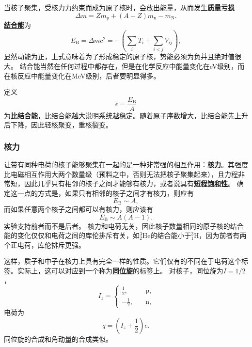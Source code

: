 \documentclass[UTF8, a4paper]{ctexart}
\newcommand*{\nuclear}[3]{^{#2}_{#3}\text{#1}}
\newcommand*{\concept}[1]{\underline{\textbf{#1}}}
\begin{document}
当核子聚集，受核力力约束而成为原子核时，会放出能量，从而发生\concept{质量亏损}
\begin{equation}
    \Delta m = Z m_\text{p} + (A - Z) m_\text{n} - m_\text{N}.
\end{equation}
\concept{结合能}为
\begin{equation}
    E_\text{B} = \Delta m c^2 = - \left( \sum_i T_i + \sum_{i < j} V_{ij} \right), 
\end{equation}
显然动能为正，上式意味着为了形成稳定的原子核，势能必须为负并且绝对值很大。
结合能当然在任何过程中都存在，但是在化学反应中能量变化在eV级别，而在核反应中能量变化在MeV级别，后者要明显得多。

定义
\begin{equation}
    \epsilon = \frac{E_\text{B}}{A} 
\end{equation}
为\concept{比结合能}，比结合能越大说明系统越稳定。随着原子序数增大，比结合能先上升后下降，因此轻核聚变，重核裂变。

\subsubsection{核力}

让带有同种电荷的核子能够聚集在一起的是一种非常强的相互作用：\concept{核力}。其强度比电磁相互作用大两个数量级（预料之中，否则无法把核子聚集起来），且力程非常短，因此几乎只有相邻的核子之间才能够有核力，或者说具有\concept{短程饱和性}。
确定这一点的方式是，如果只有相邻的核子之间才有核力，则应有
\[
    E_\text{B} \sim A,
\]
而如果任意两个核子之间都可以有核力，则应该有
\[
    E_\text{B} \sim A(A-1).
\]
实验支持前者而不是后者。
核力和电荷无关，因此核子数量相同的原子核的结合能的变化仅仅和电荷之间的库伦排斥有关，如$\nuclear{He}{3}{2}$的结合能小于$\nuclear{H}{3}{1}$，因为前者有两个正电荷，库伦排斥更强。

这样，质子和中子在核力上具有完全一样的性质。它们仅有的不同在于电荷这个标签。实际上，这可以对应到一个称为\concept{同位旋}的标签上。
对核子，同位旋为$I = 1/ 2$，
\begin{equation}
    I_z = \begin{cases}
        \frac{1}{2}, \quad &\text{p}, \\
        -\frac{1}{2}, \quad &\text{n},
    \end{cases}
\end{equation}
电荷为
\begin{equation}
    q = \left( I_z + \frac{1}{2} \right) e.
\end{equation}
同位旋的合成和角动量的合成类似。
\end{document}
